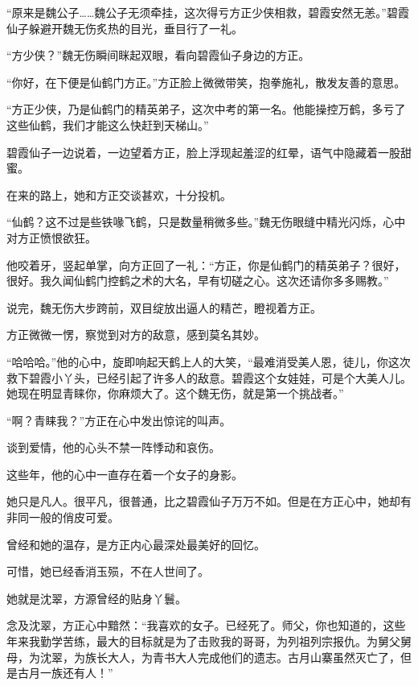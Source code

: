 
\begin{this_body}



“原来是魏公子……魏公子无须牵挂，这次得亏方正少侠相救，碧霞安然无恙。”碧霞仙子躲避开魏无伤炙热的目光，垂目行了一礼。

“方少侠？”魏无伤瞬间眯起双眼，看向碧霞仙子身边的方正。

“你好，在下便是仙鹤门方正。”方正脸上微微带笑，抱拳施礼，散发友善的意思。

“方正少侠，乃是仙鹤门的精英弟子，这次中考的第一名。他能操控万鹤，多亏了这些仙鹤，我们才能这么快赶到天梯山。”

碧霞仙子一边说着，一边望着方正，脸上浮现起羞涩的红晕，语气中隐藏着一股甜蜜。

在来的路上，她和方正交谈甚欢，十分投机。

“仙鹤？这不过是些铁喙飞鹤，只是数量稍微多些。”魏无伤眼缝中精光闪烁，心中对方正愤恨欲狂。

他咬着牙，竖起单掌，向方正回了一礼：“方正，你是仙鹤门的精英弟子？很好，很好。我久闻仙鹤门控鹤之术的大名，早有切磋之心。这次还请你多多赐教。”

说完，魏无伤大步跨前，双目绽放出逼人的精芒，瞪视着方正。

方正微微一愣，察觉到对方的敌意，感到莫名其妙。

“哈哈哈。”他的心中，旋即响起天鹤上人的大笑，“最难消受美人恩，徒儿，你这次救下碧霞小丫头，已经引起了许多人的敌意。碧霞这个女娃娃，可是个大美人儿。她现在明显青睐你，你麻烦大了。这个魏无伤，就是第一个挑战者。”

“啊？青睐我？”方正在心中发出惊诧的叫声。

谈到爱情，他的心头不禁一阵悸动和哀伤。

这些年，他的心中一直存在着一个女子的身影。

她只是凡人。很平凡，很普通，比之碧霞仙子万万不如。但是在方正心中，她却有非同一般的俏皮可爱。

曾经和她的温存，是方正内心最深处最美好的回忆。

可惜，她已经香消玉殒，不在人世间了。

她就是沈翠，方源曾经的贴身丫鬟。

念及沈翠，方正心中黯然：“我喜欢的女子。已经死了。师父，你也知道的，这些年来我勤学苦练，最大的目标就是为了击败我的哥哥，为列祖列宗报仇。为舅父舅母，为沈翠，为族长大人，为青书大人完成他们的遗志。古月山寨虽然灭亡了，但是古月一族还有人！”


\end{this_body}
